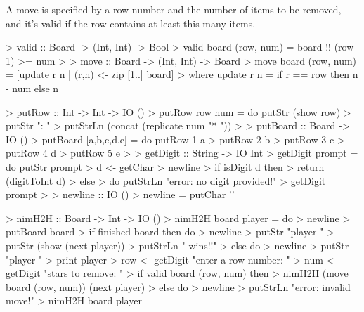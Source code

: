 \begin{impl}
A move is specified by a row number and the number of items to be removed, and it's valid if the row contains at least this many items.
\end{impl}
\begin{haskellcode}

> valid :: Board -> (Int, Int) -> Bool
> valid board (row, num) = board !! (row-1) >= num
> 
> move :: Board -> (Int, Int) -> Board
> move board (row, num) = [update r n | (r,n) <- zip [1..] board]
>      where update r n = if r == row then n - num else n

\end{haskellcode}

\begin{impl}
\end{impl}
\begin{haskellcode}

> putRow :: Int -> Int -> IO ()
> putRow row num = do putStr (show row)
>                     putStr ": "
>                     putStrLn (concat (replicate num "* "))
> 
> putBoard :: Board -> IO ()
> putBoard [a,b,c,d,e] = do putRow 1 a
>                           putRow 2 b
>                           putRow 3 c
>                           putRow 4 d
>                           putRow 5 e
> 
> getDigit :: String -> IO Int
> getDigit prompt = do putStr prompt
>                      d <- getChar
>                      newline
>                      if isDigit d then
>                         return (digitToInt d)
>                      else 
>                         do putStrLn "error: no digit provided!"
>                            getDigit prompt
> 
> newline :: IO ()
> newline = putChar '\n'

\end{haskellcode}

\begin{impl}
\end{impl}
\begin{haskellcode}

> nimH2H :: Board -> Int -> IO ()
> nimH2H board player = do
>     newline
>     putBoard board
>     if finished board then do 
>         newline
>         putStr "player "
>         putStr (show (next player))
>         putStrLn " wins!!"
>     else do
>         newline
>         putStr "player "
>         print player
>         row <- getDigit "enter a row number: "
>         num <- getDigit "stars to remove: "
>         if valid board (row, num) then
>             nimH2H (move board (row, num)) (next player)
>         else do
>             newline
>             putStrLn "error: invalid move!"
>             nimH2H board player

\end{haskellcode}

